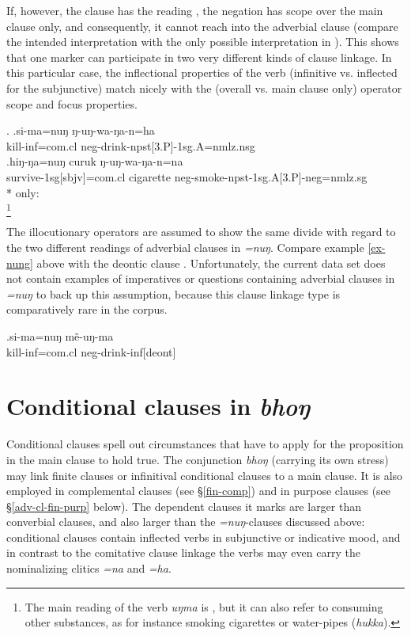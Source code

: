 If, however, the clause has the reading , the negation has scope over the main clause only, and consequently, it cannot reach into the adverbial clause (compare the intended interpretation with the only possible interpretation in \Next[b]). This shows that one marker can participate in two very different kinds of clause linkage. In this particular case, the inflectional properties of the verb (infinitive vs. inflected for the subjunctive) match nicely with the (overall vs. main clause only) operator scope and focus properties.

	\ex. \ag.si-ma=nuŋ ŋ-uŋ-wa-ŋa-n=ha\\
	kill{\sc -inf=com.cl} {\sc neg-}drink{-npst[3.P]-1sg.A=nmlz.nsg}\\
	\bg.hiŋ-ŋa=nuŋ curuk ŋ-uŋ-wa-ŋa-n=na\\
survive{\sc -1sg[sbjv]=com.cl} cigarette   {\sc neg-}smoke{\sc -npst-1sg.A[3.P]-neg=nmlz.sg}\\
* only:\\
\footnote{The main reading of the verb \emph{uŋma} is  , but it can also refer to consuming other substances, as for instance smoking cigarettes or water-pipes (\emph{hukka}).}

The illocutionary operators are assumed to show the same divide with regard to the two different readings of adverbial clauses in \emph{=nuŋ}. Compare example \ref{ex-nung} above with the deontic clause \Next. Unfortunately, the current data set does not contain examples of imperatives or questions containing adverbial clauses in \emph{=nuŋ} to back up this assumption, because this clause linkage type is comparatively rare in the corpus.

	\exg.si-ma=nuŋ mẽ-uŋ-ma\\
	kill{\sc -inf=com.cl} {\sc neg-}drink{\sc -inf[deont]}\\


\section{Conditional clauses in \emph{bhoŋ}}\label{adv-cl-cond}


Conditional clauses spell out circumstances that have to apply for the proposition in the main clause to hold true.  The conjunction \emph{bhoŋ} (carrying its own stress) may link finite clauses or infinitival conditional clauses  to a main clause. It is also employed in complemental clauses (see §\ref{fin-comp}) and in purpose clauses (see §\ref{adv-cl-fin-purp} below). The dependent clauses it marks are larger than converbial clauses, and also larger than the \emph{=nuŋ}-clauses discussed above: conditional clauses contain inflected verbs in subjunctive or indicative mood, and in contrast to the comitative clause linkage the verbs may even carry the nominalizing  clitics \emph{=na} and \emph{=ha}. 

